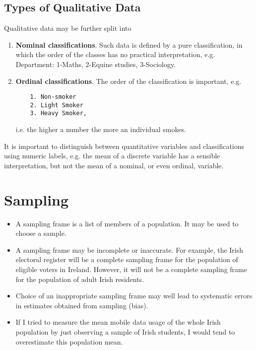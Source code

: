 \documentclass[a4paper,12pt]{article}
\begin{document}
\subsection{Types of Qualitative Data}
Qualitative data may be further split into
\begin{enumerate}
	\item \textbf{Nominal classifications}. Such data is defined by a
	pure classification, in which the order of the classes
	has no practical interpretation, e.g. Department:
	1-Maths, 2-Equine studies, 3-Sociology.
	\item \textbf{Ordinal  classifications}. The order of the
	classification is important, e.g. \begin{verbatim}
	1. Non-smoker 
	2. Light Smoker
	3. Heavy Smoker,
	\end{verbatim} i.e. the higher a
	number the more an individual smokes.
\end{enumerate}
It is important to distinguish between quantitative variables and
classifications using numeric labels, e.g. the mean of a discrete
variable has a sensible interpretation, but not the mean of a
nominal, or even ordinal, variable.

\section{Sampling}
\begin{itemize}
\item A sampling frame is a list of members of a population. It may be
used to choose a sample.
\item A sampling frame may be incomplete or inaccurate. For example,
the Irish electoral register will be a complete sampling frame for the
population of eligible voters in Ireland. However, it will not be a
complete sampling frame for the population of adult Irish residents.
\item Choice of an inappropriate sampling frame may well lead to
systematic errors in estimates obtained from sampling (bias).
\item If I tried to measure the mean mobile data usage of the whole Irish
population by just observing a sample of Irish students, I would
tend to overestimate this population mean.
\end{itemize}
\end{document}
